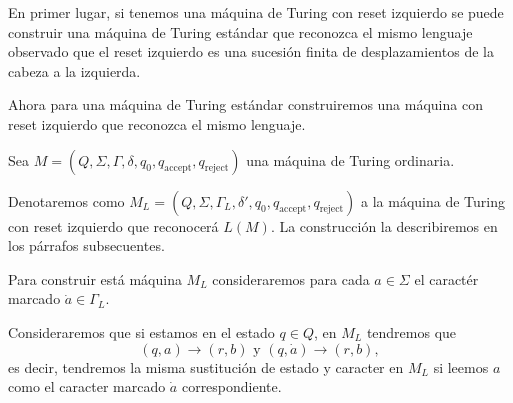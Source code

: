 \documentclass{article}
\begin{document}
\Proof 
En primer lugar, si tenemos una máquina de Turing con reset izquierdo se puede construir una máquina de Turing estándar que reconozca el mismo lenguaje observado que el reset izquierdo es una sucesión finita de desplazamientos de la cabeza a la izquierda. 

Ahora para una máquina de Turing estándar construiremos una máquina con reset izquierdo que reconozca el mismo lenguaje.

Sea $M=(Q,\Sigma,\Gamma,\delta,q_0,q_{\text{accept}},q_{\text{reject}})$ una máquina de Turing ordinaria. 

Denotaremos como $M_L=(Q,\Sigma,\Gamma_L,\delta',q_0,q_{\text{accept}},q_{\text{reject}})$ a la máquina de Turing con reset izquierdo que reconocerá $L(M)$. La construcción la describiremos en los párrafos subsecuentes. 

Para construir está máquina $M_L$ consideraremos para cada $a\in \Sigma$ el caractér marcado $\dot{a}\in \Gamma_L$.

Consideraremos que si estamos en el estado $q\in Q$, en $M_L$ tendremos que 
\[
    (q,a)\to (r,b)\text{ y }(q,\dot{a})\to (r,b),
\]
es decir, tendremos la misma sustitución de estado y caracter en $M_L$ si leemos $a$ como el caracter marcado $\dot{a}$ correspondiente.
\end{document}

